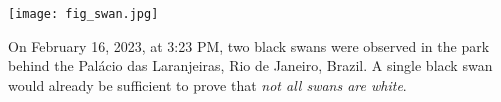 \documentclass[./main_en.tex]{subfiles}
\begin{document}
\nolinenumbers

\newpage
\renewcommand{\headrulewidth}{0pt}
\thispagestyle{fancy}
\fancyhf{} %
\fancyfoot{} %
\fancyfoot[C]{\thepage}

\par \hfill
\vspace{40mm}
\begin{adjustwidth}{45pt}{45pt}
\begin{center}
    \texttt{[image: fig\_swan.jpg]}\\
\end{center}
\vspace{10mm}
\noindent \textsf{On February 16, 2023, at 3:23 PM, two black swans were observed in the park behind the Palácio das Laranjeiras, Rio de Janeiro, Brazil. A single black swan would already be sufficient to prove that \textit{not all swans are white}.}
\end{adjustwidth}
\clearpage
\end{document}
